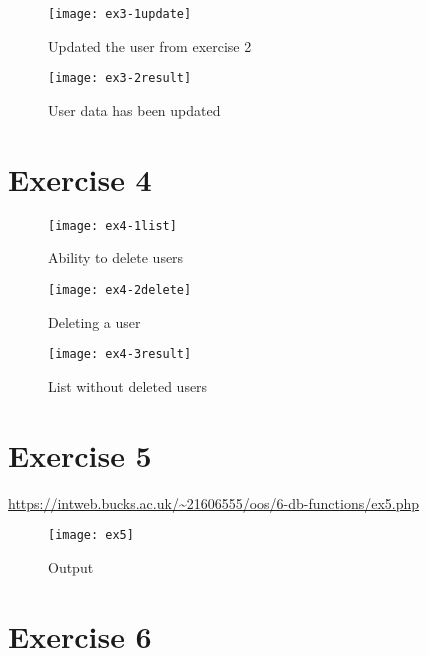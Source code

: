 \begin{figure}[H]
  \caption{Updated the user from exercise 2}
  \centering
  \texttt{[image: ex3-1update]}
\end{figure}

\begin{figure}[H]
  \caption{User data has been updated}
  \centering
  \texttt{[image: ex3-2result]}
\end{figure}

\section{Exercise 4}

\captionsetup{type=figure}


\begin{figure}[H]
  \caption{Ability to delete users}
  \centering
  \texttt{[image: ex4-1list]}
\end{figure}

\begin{figure}[H]
  \caption{Deleting a user}
  \centering
  \texttt{[image: ex4-2delete]}
\end{figure}

\begin{figure}[H]
  \caption{List without deleted users}
  \centering
  \texttt{[image: ex4-3result]}
\end{figure}

\clearpage
\section{Exercise 5}

\url{https://intweb.bucks.ac.uk/~21606555/oos/6-db-functions/ex5.php}

\captionsetup{type=figure}


\captionsetup{type=figure}


\begin{figure}[H]
  \caption{Output}
  \centering
  \texttt{[image: ex5]}
\end{figure}

\clearpage
\section{Exercise 6}

